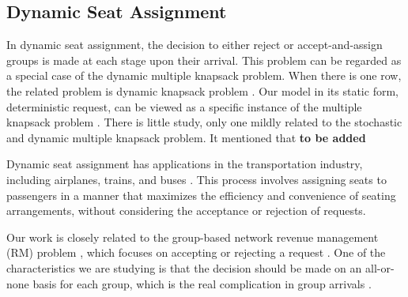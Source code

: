 
\subsection{Dynamic Seat Assignment}





In dynamic seat assignment, the decision to either reject or accept-and-assign groups is made at each stage upon their arrival. This problem can be regarded as a special case of the dynamic multiple knapsack problem. When there is one row, the related problem is dynamic knapsack problem \cite{kleywegt1998dynamic}. Our model in its static form, deterministic request, can be viewed as a specific instance of the multiple knapsack problem \cite{pisinger1999exact}. There is little study, only one mildly related to the stochastic and dynamic multiple knapsack problem. It mentioned that {\bf{to be added}}


Dynamic seat assignment has applications in the transportation industry, including airplanes, trains, and buses \cite{hamdouch2011schedule, berge1993demand}. This process involves assigning seats to passengers in a manner that maximizes the efficiency and convenience of seating arrangements, without considering the acceptance or rejection of requests.


Our work is closely related to the group-based network revenue management (RM) problem \cite{williamson1992airline}, which focuses on accepting or rejecting a request \cite{gallego1997multiproduct}. One of the characteristics we are studying is that the decision should be made on an all-or-none basis for each group, which is the real complication in group arrivals \cite{talluri2006theory}. 

